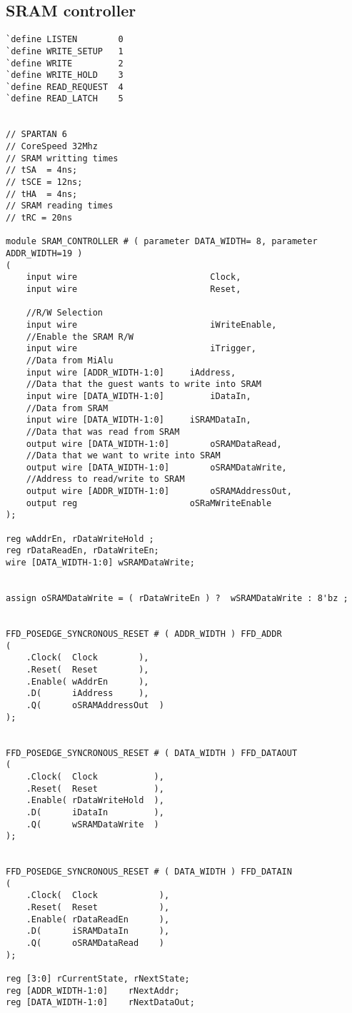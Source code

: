 \documentclass[10pt]{article}
\begin{document}
\subsection*{SRAM controller}
\begin{lstlisting}
`define LISTEN 		  0
`define WRITE_SETUP   1
`define WRITE 		  2
`define WRITE_HOLD 	  3
`define READ_REQUEST  4
`define READ_LATCH    5


// SPARTAN 6
// CoreSpeed 32Mhz
// SRAM writting times 
// tSA  = 4ns;
// tSCE = 12ns;
// tHA  = 4ns;
// SRAM reading times
// tRC = 20ns

module SRAM_CONTROLLER # ( parameter DATA_WIDTH= 8, parameter ADDR_WIDTH=19 )
(
	input wire							Clock,
	input wire							Reset,
	
	//R/W Selection
	input wire 							iWriteEnable,	     
	//Enable the SRAM R/W
	input wire 							iTrigger,		     
	//Data from MiAlu
	input wire [ADDR_WIDTH-1:0]		iAddress,           
	//Data that the guest wants to write into SRAM
	input wire [DATA_WIDTH-1:0] 		iDataIn,            
	//Data from SRAM
	input wire [DATA_WIDTH-1:0]		iSRAMDataIn,        
	//Data that was read from SRAM
	output wire [DATA_WIDTH-1:0]		oSRAMDataRead,      
	//Data that we want to write into SRAM
	output wire [DATA_WIDTH-1:0] 		oSRAMDataWrite,     
	//Address to read/write to SRAM
	output wire [ADDR_WIDTH-1:0]		oSRAMAddressOut,     
	output reg                      oSRaMWriteEnable
);

reg wAddrEn, rDataWriteHold ;
reg rDataReadEn, rDataWriteEn;
wire [DATA_WIDTH-1:0] wSRAMDataWrite;


assign oSRAMDataWrite = ( rDataWriteEn ) ?  wSRAMDataWrite : 8'bz ;


FFD_POSEDGE_SYNCRONOUS_RESET # ( ADDR_WIDTH ) FFD_ADDR 
(
	.Clock(  Clock        ),
	.Reset(  Reset        ),
	.Enable( wAddrEn      ),
	.D(      iAddress     ),
	.Q(      oSRAMAddressOut  )
);


FFD_POSEDGE_SYNCRONOUS_RESET # ( DATA_WIDTH ) FFD_DATAOUT 
(
	.Clock(  Clock           ),
	.Reset(  Reset           ),
	.Enable( rDataWriteHold  ),
	.D(      iDataIn         ),
	.Q(      wSRAMDataWrite  )
);


FFD_POSEDGE_SYNCRONOUS_RESET # ( DATA_WIDTH ) FFD_DATAIN 
(
	.Clock(  Clock            ),
	.Reset(  Reset            ),
	.Enable( rDataReadEn      ),
	.D(      iSRAMDataIn      ),
	.Q(      oSRAMDataRead    )
);

reg [3:0] rCurrentState, rNextState;
reg [ADDR_WIDTH-1:0]    rNextAddr;
reg [DATA_WIDTH-1:0]    rNextDataOut;


\end{lstlisting}
\end{document}
